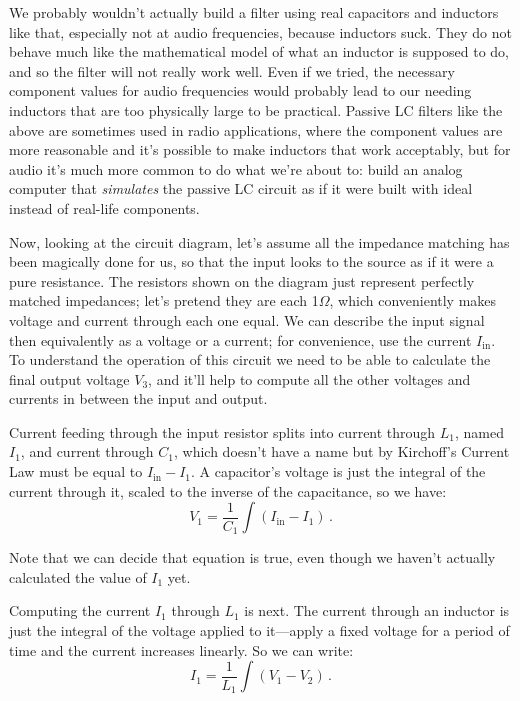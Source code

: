We probably wouldn't actually build a filter using real capacitors and
inductors like that, especially not at audio frequencies, because inductors
suck.  They do not behave much like the mathematical model of what an
inductor is supposed to do, and so the filter will not really work well. 
Even if we tried, the necessary component values for audio frequencies would
probably lead to our needing inductors that are too physically large to be
practical.  Passive LC filters like the above are sometimes used in radio
applications, where the component values are more reasonable and it's
possible to make inductors that work acceptably, but for audio it's much
more common to do what we're about to: build an analog computer that
\emph{simulates} the passive LC circuit as if it were built with ideal
instead of real-life components.

Now, looking at the circuit diagram, let's assume all the impedance matching
has been magically done for us, so that the input looks to the source as if
it were a pure resistance.  The resistors shown on the diagram just
represent perfectly matched impedances; let's pretend they are each
1$\Omega$, which conveniently makes voltage and current through each one
equal.  We can describe the input signal then
equivalently as a voltage or a current; for convenience, use the current
$I_{\textrm{in}}$.  To understand the operation of this circuit we need to
be able to calculate the final output voltage $V_3$, and it'll help to
compute all the other voltages and currents in between the input and output.

Current feeding through the input resistor splits into current through
$L_1$, named $I_1$, and current through $C_1$, which doesn't have a name but
by Kirchoff's Current Law must be equal to $I_{\textrm{in}}-I_1$.  A
capacitor's voltage is just the integral of the current through it, scaled
to the inverse of the capacitance, so we have:
\begin{equation*}
  V_1 = \frac{1}{C_1} \int (I_{\textrm{in}}-I_1) \, .
\end{equation*}

Note that we can decide that equation is true, even though we haven't
actually calculated the value of $I_1$ yet.

Computing the current $I_1$ through $L_1$ is next.  The current through an
inductor is just the integral of the voltage applied to it---apply a fixed
voltage for a period of time and the current increases linearly.  So we can
write:
\begin{equation*}
  I_1 = \frac{1}{L_1} \int (V_1-V_2) \, .
\end{equation*}

